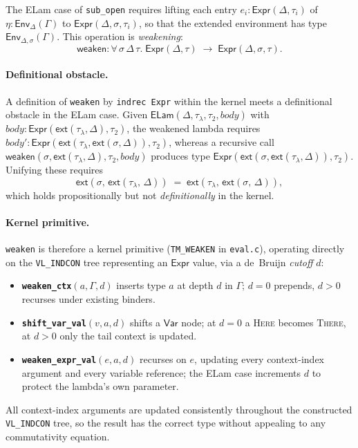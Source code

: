 \documentclass[10pt,a4paper]{article}
\newcommand{\SemEnvD}[2]{\mathsf{Env}_{#1}(#2)}
\theoremstyle{plain}
\theoremstyle{definition}
\theoremstyle{remark}
\begin{document}
The ELam case of \texttt{sub\_open} requires lifting each entry
$e_i : \mathsf{Expr}(\Delta,\tau_i)$ of $\eta : \SemEnvD{\Delta}{\Gamma}$
to $\mathsf{Expr}(\Delta,\sigma,\tau_i)$, so that the extended environment
has type $\SemEnvD{\Delta,\sigma}{\Gamma}$.  This operation is
\emph{weakening}:
\[
  \mathsf{weaken} : \forall\,\sigma\,\Delta\,\tau.\;
  \mathsf{Expr}(\Delta,\tau) \;\longrightarrow\; \mathsf{Expr}(\Delta,\sigma,\tau).
\]

\paragraph{Definitional obstacle.}
A definition of \texttt{weaken} by \texttt{indrec Expr} within the kernel
meets a definitional obstacle in the ELam case.  Given
$\mathsf{ELam}(\Delta,\tau_\lambda,\tau_2,\mathit{body})$ with
$\mathit{body}:\mathsf{Expr}(\mathsf{ext}(\tau_\lambda,\Delta),\tau_2)$,
the weakened lambda requires
$\mathit{body}':\mathsf{Expr}(\mathsf{ext}(\tau_\lambda,\mathsf{ext}(\sigma,\Delta)),\tau_2)$,
whereas a recursive call
$\mathsf{weaken}(\sigma,\mathsf{ext}(\tau_\lambda,\Delta),\tau_2,\mathit{body})$
produces type $\mathsf{Expr}(\mathsf{ext}(\sigma,\mathsf{ext}(\tau_\lambda,\Delta)),\tau_2)$.
Unifying these requires
\[
  \mathsf{ext}(\sigma,\,\mathsf{ext}(\tau_\lambda,\,\Delta))
  \;=\;
  \mathsf{ext}(\tau_\lambda,\,\mathsf{ext}(\sigma,\,\Delta)),
\]
which holds propositionally but not \emph{definitionally} in the kernel.

\paragraph{Kernel primitive.}
\texttt{weaken} is therefore a kernel primitive (\texttt{TM\_WEAKEN} in
\texttt{eval.c}), operating directly on the \texttt{VL\_INDCON} tree
representing an $\mathsf{Expr}$ value, via a de~Bruijn \emph{cutoff} $d$:
\begin{itemize}\itemsep2pt
\item \textbf{\texttt{weaken\_ctx}$(a,\Gamma,d)$} inserts type $a$ at
  depth $d$ in $\Gamma$; $d=0$ prepends, $d>0$ recurses under existing
  binders.
\item \textbf{\texttt{shift\_var\_val}$(v,a,d)$} shifts a $\mathsf{Var}$
  node; at $d=0$ a \textsc{Here} becomes \textsc{There}, at $d>0$ only
  the tail context is updated.
\item \textbf{\texttt{weaken\_expr\_val}$(e,a,d)$} recurses on $e$,
  updating every context-index argument and every variable reference; the
  ELam case increments $d$ to protect the lambda's own parameter.
\end{itemize}
All context-index arguments are updated consistently throughout the
constructed \texttt{VL\_INDCON} tree, so the result has the correct type
without appealing to any commutativity equation.
\end{document}
